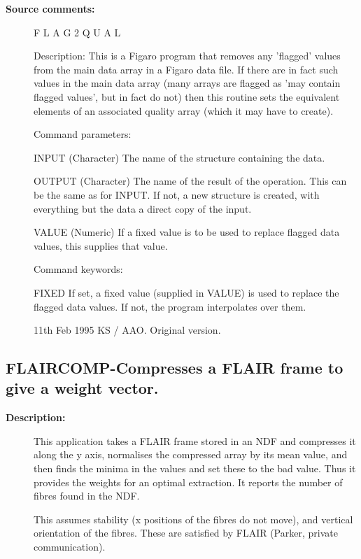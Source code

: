 \begin{description}
\begin{description}
\item [\textbf{Source comments:}]
\begin{terminalv}
 F L A G 2 Q U A L

 Description:
    This is a Figaro program that removes any 'flagged' values from
    the main data array in a Figaro data file. If there are in fact
    such values in the main data array (many arrays are flagged as
    'may contain flagged values', but in fact do not) then this
    routine sets the equivalent elements of an associated quality
    array (which it may have to create).

 Command parameters:

    INPUT  (Character) The name of the structure containing the data.

    OUTPUT (Character) The name of the result of the operation.  This
           can be the same as for INPUT.  If not, a new structure
           is created, with everything but the data a direct
           copy of the input.

    VALUE  (Numeric) If a fixed value is to be used to replace flagged
           data values, this supplies that value.

 Command keywords:

    FIXED  If set, a fixed value (supplied in VALUE) is used
           to replace the flagged data values. If not, the program
           interpolates over them.

    11th Feb 1995  KS / AAO.  Original version.

\end{terminalv}
\end{description}
\subsection{FLAIRCOMP-\label{FLAIRCOMP}Compresses a FLAIR frame to give a weight vector.}
\begin{description}

\item [\textbf{Description:}]
 This application takes a FLAIR frame stored in an NDF and
 compresses it along the y axis, normalises the compressed array
 by its mean value, and then finds the minima in the values and
 set these to the bad value.  Thus it provides the weights for an
 optimal extraction.  It reports the number of fibres found in the
 NDF.

 This assumes stability (x positions of the fibres do not move),
 and vertical orientation of the fibres.  These are satisfied by
 FLAIR (Parker, private communication).


\end{description}
\end{description}
